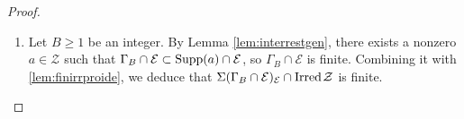 \documentclass[11pt,a4paper,reqno]{amsart}
\theoremstyle{definition}
\begin{document}
\begin{proof}
\begin{enumerate}
\begin{proof}[Proof of Claim \ref{claim:finiteK}]
On the other hand, with the partial order on $\mathbb{N}^r$:
$${\bf c}=(c_1,\dots,c_r) \leq {\bf d}=(d_1,\dots,d_r)\,\, \textrm{if and only if}\,\,c_1 \leq d_1,\dots,c_r \leq d_r,$$ it is well-known that $(\mathbb{N}^r, \leq)$ does not contain an infinite family of pairwise noncomparable elements, see, e.g., \cite[Theorem 1.1(1)]{AA2020}.

Consequently $\mathcal{K}$ is finite.
\end{proof} 

\item Let $B \geq 1$ be an integer. By Lemma \ref{lem:interrestgen}, there exists a nonzero $a \in \mathcal{Z}$ such that $\Gamma_B \cap \mathcal{E} \subset {\rm Supp}(a) \cap \mathcal{E}$, so $\Gamma_B \cap \mathcal{E}$ is finite. Combining it with \eqref{lem:finirrproide}, we deduce that $\Sigma(\Gamma_B \cap \mathcal{E})_{\mathcal{E}} \cap {\rm Irred}\hskip 1pt \mathcal{Z}$ is finite.
\end{enumerate}
\end{proof}
\end{document}
